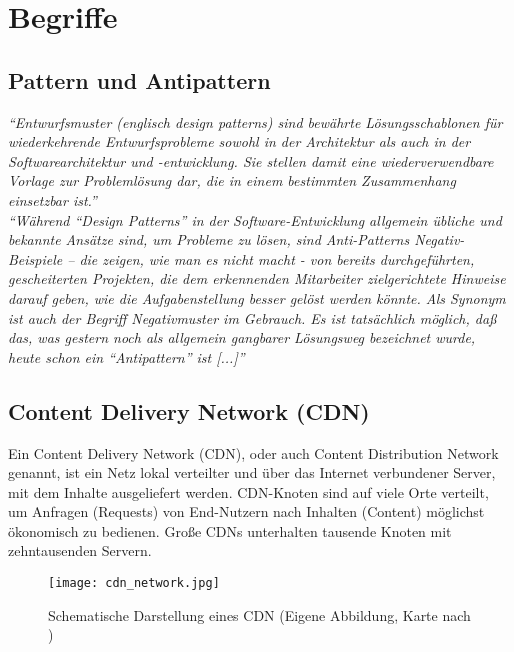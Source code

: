 
\section{Begriffe}
\label{sec:begriffe}
	\subsection{Pattern und Antipattern} %
	\label{sub:pattern_und_anti_pattern}
		\textit{"`Entwurfsmuster (englisch design patterns) sind bewährte Lösungsschablonen für wiederkehrende Entwurfsprobleme sowohl in der Architektur als auch in der Softwarearchitektur und -entwicklung. Sie stellen damit eine wiederverwendbare Vorlage zur Problemlösung dar, die in einem bestimmten Zusammenhang einsetzbar ist."'} \autocite{pattern15}
		\\

		\textit{"`Während "`Design Patterns"' in der Software-Entwicklung allgemein übliche und bekannte Ansätze sind, um Probleme zu lösen, sind Anti-Patterns Negativ-Beispiele – die zeigen, wie man es nicht macht - von bereits durchgeführten, gescheiterten Projekten, die dem erkennenden Mitarbeiter zielgerichtete Hinweise darauf geben, wie die Aufgabenstellung besser gelöst werden könnte. Als Synonym ist auch der Begriff Negativmuster im Gebrauch. Es ist tatsächlich möglich, daß das, was gestern noch als allgemein gangbarer Lösungsweg bezeichnet wurde, heute schon ein "`Antipattern"' ist [...]"'} \autocite{Stepken06}



	\subsection{Content Delivery Network (CDN)} %
	\label{sub:content_delivery_network}
		Ein Content Delivery Network (CDN), oder auch Content Distribution Network genannt, ist ein Netz lokal verteilter und über das Internet verbundener Server, mit dem Inhalte ausgeliefert werden. CDN-Knoten sind auf viele Orte verteilt, um Anfragen (Requests) von End-Nutzern nach Inhalten (Content) möglichst ökonomisch zu bedienen. Große CDNs unterhalten tausende Knoten mit zehntausenden Servern.\autocite[vgl.]{wikipediaCDN}

		\begin{figure}[htbp]
			\begin{center}
				\texttt{[image: cdn\_network.jpg]}
				\caption{Schematische Darstellung eines CDN (Eigene Abbildung, Karte nach \autocite{ritz14})}
				\label{fig:cdn_network}
			\end{center}
		\end{figure}
		
